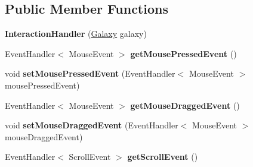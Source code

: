 \subsection*{Public Member Functions}
\begin{DoxyCompactItemize}
\item 
\mbox{\label{classfr_1_1groupe40_1_1projet_1_1client_1_1handler_1_1_interaction_handler_a8dd863e883515616cc850b0bfdf739d6}} 
{\bfseries Interaction\+Handler} (\hyperlink{classfr_1_1groupe40_1_1projet_1_1model_1_1board_1_1_galaxy}{Galaxy} galaxy)
\item 
\mbox{\label{classfr_1_1groupe40_1_1projet_1_1client_1_1handler_1_1_interaction_handler_a5c28d18fd9bcfa863f40fcace497f9f3}} 
Event\+Handler$<$ Mouse\+Event $>$ {\bfseries get\+Mouse\+Pressed\+Event} ()
\item 
\mbox{\label{classfr_1_1groupe40_1_1projet_1_1client_1_1handler_1_1_interaction_handler_ac57c4caa8e5e43adbc4e4eec4985bb1e}} 
void {\bfseries set\+Mouse\+Pressed\+Event} (Event\+Handler$<$ Mouse\+Event $>$ mouse\+Pressed\+Event)
\item 
\mbox{\label{classfr_1_1groupe40_1_1projet_1_1client_1_1handler_1_1_interaction_handler_a06995a2ecf5e028168a3f6609b6f7474}} 
Event\+Handler$<$ Mouse\+Event $>$ {\bfseries get\+Mouse\+Dragged\+Event} ()
\item 
\mbox{\label{classfr_1_1groupe40_1_1projet_1_1client_1_1handler_1_1_interaction_handler_ab79eaad9e04d563e63eda350e8a29fb2}} 
void {\bfseries set\+Mouse\+Dragged\+Event} (Event\+Handler$<$ Mouse\+Event $>$ mouse\+Dragged\+Event)
\item 
\mbox{\label{classfr_1_1groupe40_1_1projet_1_1client_1_1handler_1_1_interaction_handler_a2ded2c50060e147f219c8d0d1a371018}} 
Event\+Handler$<$ Scroll\+Event $>$ {\bfseries get\+Scroll\+Event} ()
\item 

\end{DoxyCompactItemize}
